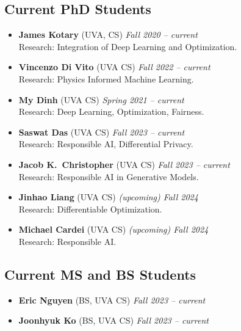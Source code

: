 \medskip

\subsection*{Current PhD Students}
\begin{itemize}
  \item \textbf{James Kotary} ({\sc UVA}, CS) 
  \hfill{\em Fall 2020 -- current}\\
  {\sc Research}: Integration of Deep Learning and Optimization.

  \item \textbf{Vincenzo Di Vito} ({\sc UVA} CS)
  \hfill{\em Fall 2022 -- current}\\
  {\sc Research:} Physics Informed Machine Learning.
  
  \item \textbf{My Dinh} ({\sc UVA} CS) 
  \hfill{\em Spring 2021 -- current}\\
  {\sc Research}: Deep Learning, Optimization, Fairness.

  \item \textbf{Saswat Das} ({\sc UVA} CS)
  \hfill{\em Fall 2023 -- current}\\
  {\sc Research:} Responsible AI, Differential Privacy.

  \item \textbf{Jacob K.~Christopher} ({\sc UVA} CS)
  \hfill{\em Fall 2023 -- current}\\
  {\sc Research:} Responsible AI in Generative Models.

  \item \textbf{Jinhao Liang} ({\sc UVA} CS)
  \hfill{\em (upcoming) Fall 2024}\\
  {\sc Research:} Differentiable Optimization.

  \item \textbf{Michael Cardei} ({\sc UVA} CS)
  \hfill{\em (upcoming) Fall 2024}\\
  {\sc Research:} Responsible AI.
\end{itemize}

\subsection*{Current MS and BS Students}
\begin{itemize}
  \item  \textbf{Eric Nguyen} ({\sc BS, UVA} CS) 
    \hfill{\em Fall 2023 -- current}
  \item  \textbf{Joonhyuk Ko} ({\sc BS, UVA} CS) 
    \hfill{\em Fall 2023 -- current}
\end{itemize}

